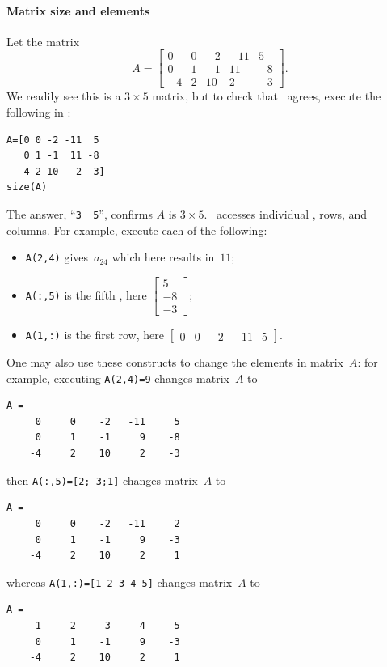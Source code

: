\paragraph{Matrix size and elements}
Let the matrix
\begin{equation*}
A=\begin{bmatrix} 0 & 0 & -2 & -11 & 5\\ 0 & 1 & -1 & 11 & -8\\ -4 & 2 & 10 & 2 & -3 \end{bmatrix}.
\end{equation*}
We readily see this is a \(3\times5\) matrix, but to check that \script\ agrees, execute the following in \script: 
\begin{verbatim}
A=[0 0 -2 -11  5
   0 1 -1  11 -8
  -4 2 10   2 -3]
size(A)
\end{verbatim}
\setbox\ajrqrbox\hbox{}%
\marginajrbox%
The answer, ``\verb|3  5|'', confirms \(A\) is \(3\times5\).
\script\ accesses individual , rows, and columns.
For example, execute each of the following:
\begin{itemize}
\item \verb|A(2,4)| gives~\(a_{24}\) which here results in~\(11\);
\item \verb|A(:,5)| is the fifth , here \(\begin{bmatrix} 5\\ -8\\ -3 \end{bmatrix}\);
\item \verb|A(1,:)| is the first row, here \(\begin{bmatrix} 0 & 0 & -2 & -11 & 5 \end{bmatrix}\).
\end{itemize}
One may also use these constructs to change the elements in matrix~\(A\): for example, executing
\verb|A(2,4)=9| changes matrix~\(A\) to
\begin{verbatim}
A =
     0     0    -2   -11     5
     0     1    -1     9    -8
    -4     2    10     2    -3
\end{verbatim}
then \verb|A(:,5)=[2;-3;1]| changes matrix~\(A\) to
\begin{verbatim}
A =
     0     0    -2   -11     2
     0     1    -1     9    -3
    -4     2    10     2     1
\end{verbatim}
whereas \verb|A(1,:)=[1 2 3 4 5]| changes matrix~\(A\) to
\begin{verbatim}
A =
     1     2     3     4     5
     0     1    -1     9    -3
    -4     2    10     2     1
\end{verbatim}


